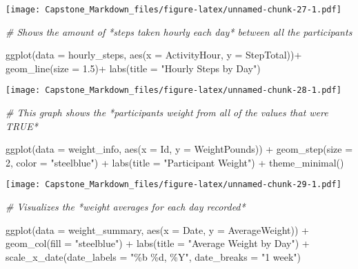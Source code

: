 \documentclass[
]{article}
\newenvironment{Shaded}{\begin{snugshade}}{\end{snugshade}}
\newcommand{\AttributeTok}[1]{\textcolor[rgb]{0.77,0.63,0.00}{#1}}
\newcommand{\CommentTok}[1]{\textcolor[rgb]{0.56,0.35,0.01}{\textit{#1}}}
\newcommand{\DecValTok}[1]{\textcolor[rgb]{0.00,0.00,0.81}{#1}}
\newcommand{\FloatTok}[1]{\textcolor[rgb]{0.00,0.00,0.81}{#1}}
\newcommand{\FunctionTok}[1]{\textcolor[rgb]{0.00,0.00,0.00}{#1}}
\newcommand{\NormalTok}[1]{#1}
\newcommand{\SpecialCharTok}[1]{\textcolor[rgb]{0.00,0.00,0.00}{#1}}
\newcommand{\StringTok}[1]{\textcolor[rgb]{0.31,0.60,0.02}{#1}}
\begin{document}
\texttt{[image: Capstone\_Markdown\_files/figure-latex/unnamed-chunk-27-1.pdf]}

\begin{Shaded}
\begin{Highlighting}[]
\CommentTok{\# Shows the amount of *steps taken hourly each day* between all the participants }

\FunctionTok{ggplot}\NormalTok{(}\AttributeTok{data =}\NormalTok{ hourly\_steps, }\FunctionTok{aes}\NormalTok{(}\AttributeTok{x =}\NormalTok{ ActivityHour, }\AttributeTok{y =}\NormalTok{ StepTotal))}\SpecialCharTok{+}
  \FunctionTok{geom\_line}\NormalTok{(}\AttributeTok{size =} \FloatTok{1.5}\NormalTok{)}\SpecialCharTok{+}
  \FunctionTok{labs}\NormalTok{(}\AttributeTok{title =} \StringTok{"Hourly Steps by Day"}\NormalTok{)}
\end{Highlighting}
\end{Shaded}

\texttt{[image: Capstone\_Markdown\_files/figure-latex/unnamed-chunk-28-1.pdf]}

\begin{Shaded}
\begin{Highlighting}[]
\CommentTok{\# This graph shows the *participants weight from all of the values that were TRUE*}

\FunctionTok{ggplot}\NormalTok{(}\AttributeTok{data =}\NormalTok{ weight\_info, }\FunctionTok{aes}\NormalTok{(}\AttributeTok{x =}\NormalTok{ Id, }\AttributeTok{y =}\NormalTok{ WeightPounds)) }\SpecialCharTok{+}
  \FunctionTok{geom\_step}\NormalTok{(}\AttributeTok{size =} \DecValTok{2}\NormalTok{, }\AttributeTok{color =} \StringTok{"steelblue"}\NormalTok{) }\SpecialCharTok{+}
  \FunctionTok{labs}\NormalTok{(}\AttributeTok{title =} \StringTok{"Participant Weight"}\NormalTok{) }\SpecialCharTok{+}
  \FunctionTok{theme\_minimal}\NormalTok{()}
\end{Highlighting}
\end{Shaded}

\texttt{[image: Capstone\_Markdown\_files/figure-latex/unnamed-chunk-29-1.pdf]}

\begin{Shaded}
\begin{Highlighting}[]
\CommentTok{\# Visualizes the *weight averages for each day recorded* }

\FunctionTok{ggplot}\NormalTok{(}\AttributeTok{data =}\NormalTok{ weight\_summary, }\FunctionTok{aes}\NormalTok{(}\AttributeTok{x =}\NormalTok{ Date, }\AttributeTok{y =}\NormalTok{ AverageWeight)) }\SpecialCharTok{+}
  \FunctionTok{geom\_col}\NormalTok{(}\AttributeTok{fill =} \StringTok{"steelblue"}\NormalTok{) }\SpecialCharTok{+}
  \FunctionTok{labs}\NormalTok{(}\AttributeTok{title =} \StringTok{"Average Weight by Day"}\NormalTok{) }\SpecialCharTok{+} 
  \FunctionTok{scale\_x\_date}\NormalTok{(}\AttributeTok{date\_labels =} \StringTok{"\%b \%d, \%Y"}\NormalTok{, }\AttributeTok{date\_breaks =} \StringTok{"1 week"}\NormalTok{)}
\end{Highlighting}
\end{Shaded}
\end{document}
